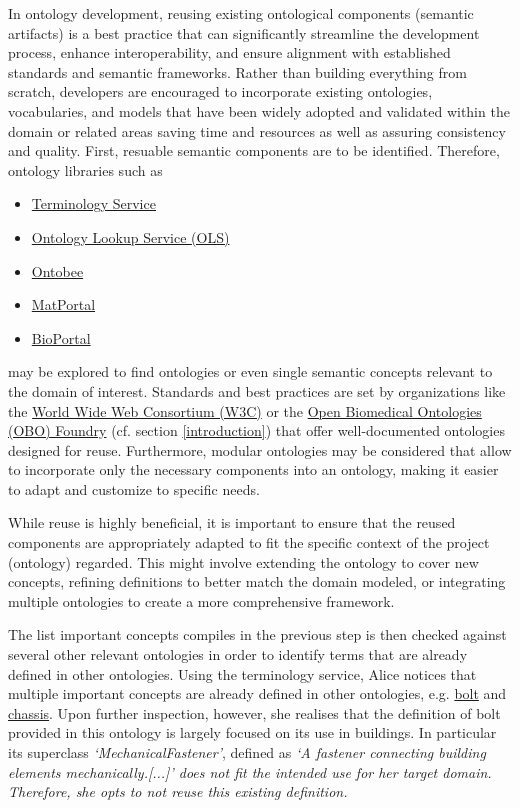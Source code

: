 In ontology development, reusing existing ontological components (semantic artifacts) is a best practice that can significantly streamline the development process, enhance interoperability, and ensure alignment with established standards and semantic frameworks. Rather than building everything from scratch, developers are encouraged to incorporate existing ontologies, vocabularies, and models that have been widely adopted and validated within the domain or related areas saving time and resources as well as assuring consistency and quality.
First, resuable semantic components are to be identified. Therefore, ontology libraries such as
\begin{itemize}
    \item \href{https://terminology.tib.eu/ts}{Terminology Service} 
    \item \href{https://www.ebi.ac.uk/ols/index}{Ontology Lookup Service (OLS)}
    \item \href{https://ontobee.org/}{Ontobee}
    \item \href{https://matportal.org/}{MatPortal}
    \item \href{https://bioportal.bioontology.org/}{BioPortal}
\end{itemize}
may be explored to find ontologies or even single semantic concepts relevant to the domain of interest. Standards and best practices are set by organizations like the \href{https://www.w3.org/}{World Wide Web Consortium (W3C)} or the \href{https://obofoundry.org/}{Open Biomedical Ontologies (OBO) Foundry} (cf. section \ref{introduction}) that offer well-documented ontologies designed for reuse. Furthermore, modular ontologies may be considered that allow to incorporate only the necessary components into an ontology, making it easier to adapt and customize to specific needs.

While reuse is highly beneficial, it is important to ensure that the reused components are appropriately adapted to fit the specific context of the project (ontology) regarded. This might involve extending the ontology to cover new concepts, refining definitions to better match the domain modeled, or integrating multiple ontologies to create a more comprehensive framework.

\begin{example}
The list important concepts compiles in the previous step is then checked against several other relevant ontologies in order to identify terms that are already defined in other ontologies. Using the terminology service, Alice notices that multiple important concepts are already defined in other ontologies, e.g. \href{https://pi.pauwel.be/voc/buildingelement#MechanicalFastener-BOLT}{bolt} and \href{http://purl.obolibrary.org/obo/NCIT_C49869}{chassis}. Upon further inspection, however, she realises that the definition of bolt provided in this ontology is largely focused on its use in buildings. In particular its superclass \textit{`MechanicalFastener'}, defined as \textit{`A fastener connecting building elements mechanically.[...]' does not fit the intended use for her target domain. Therefore, she opts to not reuse this existing definition.} 
\end{example}


